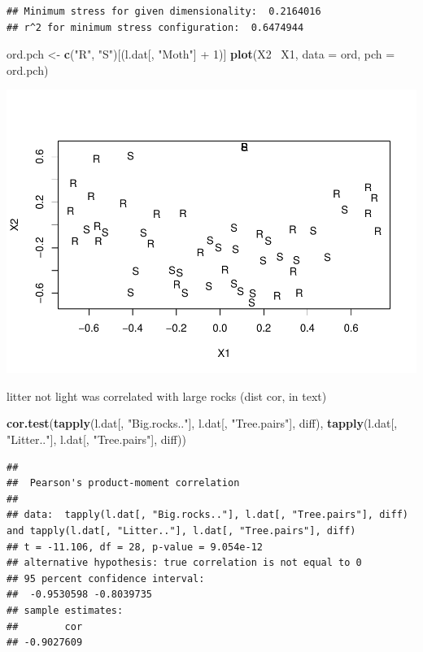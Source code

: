 \documentclass[]{article}
\newenvironment{Shaded}{\begin{snugshade}}{\end{snugshade}}
\newcommand{\KeywordTok}[1]{\textcolor[rgb]{0.13,0.29,0.53}{\textbf{{#1}}}}
\newcommand{\DataTypeTok}[1]{\textcolor[rgb]{0.13,0.29,0.53}{{#1}}}
\newcommand{\DecValTok}[1]{\textcolor[rgb]{0.00,0.00,0.81}{{#1}}}
\newcommand{\StringTok}[1]{\textcolor[rgb]{0.31,0.60,0.02}{{#1}}}
\newcommand{\NormalTok}[1]{{#1}}
\begin{document}
\begin{verbatim}
## Minimum stress for given dimensionality:  0.2164016 
## r^2 for minimum stress configuration:  0.6474944
\end{verbatim}

\begin{Shaded}
\begin{Highlighting}[]
\NormalTok{ord.pch <-}\StringTok{ }\KeywordTok{c}\NormalTok{(}\StringTok{"R"}\NormalTok{, }\StringTok{"S"}\NormalTok{)[(l.dat[, }\StringTok{"Moth"}\NormalTok{] +}\StringTok{ }\DecValTok{1}\NormalTok{)]}
\KeywordTok{plot}\NormalTok{(X2~}\StringTok{ }\NormalTok{X1, }\DataTypeTok{data =} \NormalTok{ord, }\DataTypeTok{pch =} \NormalTok{ord.pch)}
\end{Highlighting}
\end{Shaded}

\includegraphics{rln_files/figure-latex/ord-com-plot-1.pdf}

litter not light was correlated with large rocks (dist cor, in text)

\begin{Shaded}
\begin{Highlighting}[]
\KeywordTok{cor.test}\NormalTok{(}\KeywordTok{tapply}\NormalTok{(l.dat[, }\StringTok{"Big.rocks.."}\NormalTok{], l.dat[, }\StringTok{"Tree.pairs"}\NormalTok{], diff),}
         \KeywordTok{tapply}\NormalTok{(l.dat[, }\StringTok{"Litter.."}\NormalTok{], l.dat[, }\StringTok{"Tree.pairs"}\NormalTok{], diff))}
\end{Highlighting}
\end{Shaded}

\begin{verbatim}
## 
##  Pearson's product-moment correlation
## 
## data:  tapply(l.dat[, "Big.rocks.."], l.dat[, "Tree.pairs"], diff) and tapply(l.dat[, "Litter.."], l.dat[, "Tree.pairs"], diff)
## t = -11.106, df = 28, p-value = 9.054e-12
## alternative hypothesis: true correlation is not equal to 0
## 95 percent confidence interval:
##  -0.9530598 -0.8039735
## sample estimates:
##        cor 
## -0.9027609
\end{verbatim}
\end{document}
